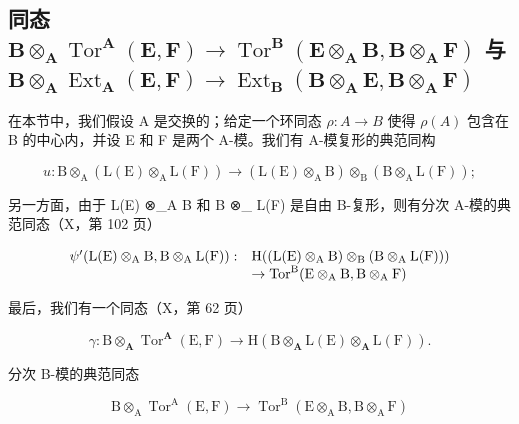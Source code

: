 \subsection{\texorpdfstring{同态 \(\mathbf{B} \otimes_{\mathbf{A}} \operatorname{Tor}^{\mathbf{A}}(\mathbf{E}, \mathbf{F}) \to \operatorname{Tor}^{\mathbf{B}}(\mathbf{E} \otimes_{\mathbf{A}} \mathbf{B}, \mathbf{B} \otimes_{\mathbf{A}} \mathbf{F})\) 与 \(\mathbf{B} \otimes_{\mathbf{A}} \operatorname{Ext}_{\mathbf{A}}(\mathbf{E}, \mathbf{F}) \to \operatorname{Ext}_{\mathbf{B}}(\mathbf{B} \otimes_{\mathbf{A}} \mathbf{E}, \mathbf{B} \otimes_{\mathbf{A}} \mathbf{F})\)}{Tor 与 Ext 的标量扩张同态}}

在本节中，我们假设 A 是交换的；给定一个环同态 \(\rho: A \to B\) 使得 \(\rho(A)\) 包含在 B 的中心内，并设 E 和 F 是两个 A-模。我们有 A-模复形的典范同构

\[
u: \mathrm{B} \otimes_ {\mathrm{A}} (\mathrm{L} (\mathrm{E}) \otimes_ {\mathrm{A}} \mathrm{L} (\mathrm{F})) \rightarrow (\mathrm{L} (\mathrm{E}) \otimes_ {\mathrm{A}} \mathrm{B}) \otimes_ {\mathrm{B}} (\mathrm{B} \otimes_ {\mathrm{A}} \mathrm{L} (\mathrm{F}));
\]

另一方面，由于 L(E) ⊗\_A B 和 B ⊗\_ L(F) 是自由 B-复形，则有分次 A-模的典范同态（X，第 102 页）

\[
\begin{array}{r l} \psi^ {\prime} (\mathrm{L(E)} \otimes_ {\mathrm{A}} \mathrm{B}, \mathrm{B} \otimes_ {\mathrm{A}} \mathrm{L(F)}): & \mathrm{H} ((\mathrm{L(E)} \otimes_ {\mathrm{A}} \mathrm{B}) \otimes_ {\mathrm{B}} (\mathrm{B} \otimes_ {\mathrm{A}} \mathrm{L(F)})) \\ & \to \operatorname{Tor} ^ {\mathrm{B}} (\mathrm{E} \otimes_ {\mathrm{A}} \mathrm{B}, \mathrm{B} \otimes_ {\mathrm{A}} \mathrm{F}) \end{array}
\]

最后，我们有一个同态（X，第 62 页）

\[
\gamma : \mathrm{B} \otimes_ {\mathbf {A}} \operatorname{Tor} ^ {\mathbf {A}} (\mathrm{E}, \mathrm{F}) \rightarrow \mathrm{H} (\mathrm{B} \otimes_ {\mathbf {A}} \mathrm{L} (\mathrm{E}) \otimes_ {\mathbf {A}} \mathrm{L} (\mathrm{F})) .
\]

分次 B-模的典范同态

\[
\mathrm{B} \otimes_ {\mathrm{A}} \operatorname{Tor} ^ {\mathrm{A}} (\mathrm{E}, \mathrm{F}) \rightarrow \operatorname{Tor} ^ {\mathrm{B}} (\mathrm{E} \otimes_ {\mathrm{A}} \mathrm{B}, \mathrm{B} \otimes_ {\mathrm{A}} \mathrm{F})\tag{13}
\]


